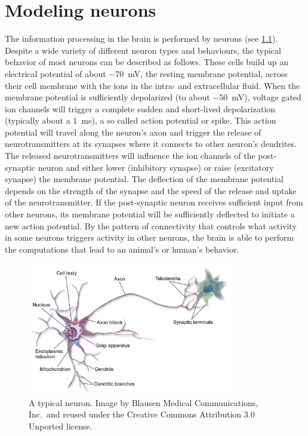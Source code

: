 \chapter{Modeling neurons}\label{sec:neurons}
The information processing in the brain is performed by neurons (see \cref{fig:neuron}).
Despite a wide variety of different neuron types and behaviours, the typical behavior of most neurons can be described as follows.
These cells build up an electrical potential of about \SI{-70}{\milli\volt}, the resting membrane potential, across their cell membrane with the ions in the intra- and extracellular fluid.
When the membrane potential is sufficiently depolarized (to about \SI{-50}{\milli\volt}), voltage gated ion channels will trigger a complete sudden and short-lived depolarization (typically about a \SI{1}{\milli\second}), a so called action potential or spike.
This action potential will travel along the neuron's axon and trigger the release of neurotransmitters at its synapses where it connects to other neuron's dendrites.
The released neurotransmitters will influence the ion channels of the post-synaptic neuron and either lower (inhibitory synapse) or raise (excitatory synapse) the membrane potential.
The deflection of the membrane potential depends on the strength of the synapse and the speed of the release and uptake of the neurotransmitter.
If the post-synaptic neuron receives sufficient input from other neurons, its membrane potential will be sufficiently deflected to initiate a new action potential.
By the pattern of connectivity that controls what activity in some neurons triggers activity in other neurons, the brain is able to perform the computations that lead to an animal's or human's behavior.

\begin{figure}
    \centering
    \includegraphics[width=0.8\textwidth]{figures/Blausen_0657_MultipolarNeuron}
    \caption[A typical neuron]{A typical neuron. Image by Blausen Medical Communications, Inc.\ and reused under the Creative Commons Attribution 3.0 Unported license.}\label{fig:neuron}
\end{figure}

